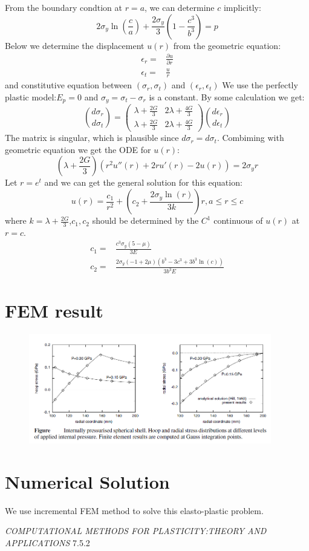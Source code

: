 \documentclass{article}
\begin{document}
From the boundary condtion at $r=a$, we can determine $c$ implicitly:
\begin{equation}
2\sigma_y\ln(\frac{c}{a})+\frac{2\sigma_y}{3}(1-\frac{c^3}{b^3})=p
\end{equation}
Below we determine the displacement $u(r)$ from the geometric equation:
\begin{align}
\epsilon_r=&\frac{\partial u}{\partial r}\\
\epsilon_t=&\frac{u}{r}
\end{align}
and constitutive equation between $(\sigma_r,\sigma_t)$ and $(\epsilon_r,\epsilon_t)$
We use the perfectly plastic model:$E_p=0$ and $\sigma_y=\sigma_t-\sigma_r$ is a constant.
By some calculation we get:
\begin{equation}
\binom{d\sigma_r}{d\sigma_t}=\left(\begin{matrix}
\lambda+\frac{2G}{3}&2\lambda+\frac{4G}{3}\\
\lambda+\frac{2G}{3}&2\lambda+\frac{4G}{3}
\end{matrix}\right)
\binom{d\epsilon_r}{d\epsilon_t}
\end{equation}
The matrix is singular, which is plausible since $d\sigma_r=d\sigma_t$.
Combiming with geometric equation we get the ODE for $u(r)$:
\begin{equation}
(\lambda+\frac{2G}{3})(r^2 u''(r)+2ru'(r)-2u(r))=2\sigma_y r
\end{equation}
Let $r=e^t$ and we can get the general solution for this equation:
\[
u(r)=\frac{c_1}{r^2}+(c_2+\frac{2\sigma_y \ln(r)}{3k})r,a\leq r \leq c
\]
where $k=\lambda+\frac{2G}{3}$,$c_1,c_2$ should be determined by the $C^1$ continuous of $u(r)$ at $r=c$.
\begin{align}
c_1=&\frac{c^3\sigma_y(5-\mu)}{3E}\\
c_2=&\frac{2\sigma_y(-1+2\mu)(b^3-3c^3+3b^3\ln(c))}{3b^3E}
\end{align}
\newpage
\section{FEM result}
\begin{figure}[!ht]
\center
\includegraphics[width=300pt]{hollow_sphere_fem_result.png}
\end{figure}
\section{Numerical Solution}
We use incremental FEM method to solve this elasto-plastic problem.
\begin{thebibliography}{9}
  \textit{COMPUTATIONAL METHODS FOR PLASTICITY:THEORY AND APPLICATIONS} 7.5.2
\end{thebibliography}
\end{document}
